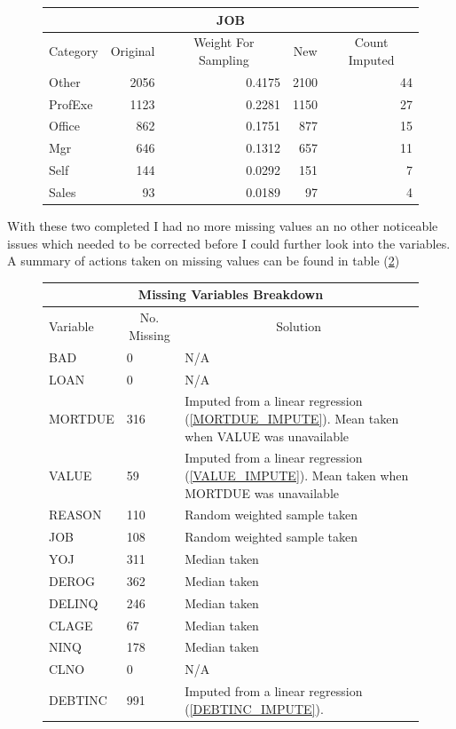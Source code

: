 \begin{figure}[ht]\label{JOB_IMPUTES}
	\centering
	\renewcommand{\arraystretch}{1.25}
	\begin{tabular}{lrrrr}
	\multicolumn{5}{c}{JOB}\\
	\hline
	Category & \multicolumn{1}{c}{Original} & \multicolumn{1}{c}{Weight For Sampling} & \multicolumn{1}{c}{New} & \multicolumn{1}{c}{Count Imputed} \\ 
	\hline
	Other & 2056 & 0.4175 & 2100 & 44 \\
	ProfExe & 1123 & 0.2281 & 1150 & 27 \\
	Office & 862 & 0.1751 & 877 & 15 \\
	Mgr & 646 & 0.1312 & 657  & 11 \\
	Self & 144 & 0.0292 & 151  & 7 \\
	Sales & 93 & 0.0189 & 97 & 4 \\
	\end{tabular}
\end{figure}

With these two completed I had no more missing values an no other noticeable issues which needed to be corrected before I could further look into the variables. A summary of actions taken on missing values can be found in table (\ref{data_clean})

\begin{figure}[ht]\label{data_clean}
	\centering
	\renewcommand{\arraystretch}{1.25}
	\begin{tabular}{l p{3cm} p{9cm}}
	\multicolumn{3}{c}{Missing Variables Breakdown}\\
	\hline
	Variable & \multicolumn{1}{c}{No. Missing} & \multicolumn{1}{c}{Solution}\\ 
	\hline
	BAD & 0 & N/A\\
	LOAN & 0 & N/A \\
	MORTDUE & 316 & Imputed from a linear regression (\ref{MORTDUE_IMPUTE}). Mean taken when VALUE was unavailable \\
	VALUE & 59 & Imputed from a linear regression (\ref{VALUE_IMPUTE}). Mean taken when MORTDUE was unavailable \\
	REASON & 110 & Random weighted sample taken \\
	JOB & 108 & Random weighted sample taken \\
	YOJ & 311 & Median taken\\
	DEROG & 362 & Median taken \\
	DELINQ & 246 & Median taken\\
	CLAGE & 67 & Median taken \\
	NINQ & 178 & Median taken\\
	CLNO & 0 & N/A \\
	DEBTINC & 991 & Imputed from a linear regression (\ref{DEBTINC_IMPUTE}).\\
	\end{tabular}
\end{figure}

